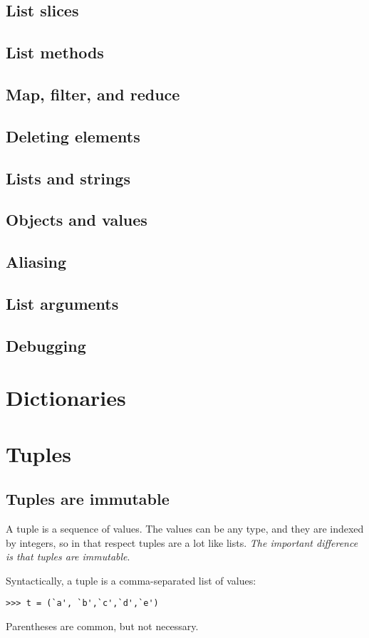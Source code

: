 \documentclass{article}
\begin{document}
\subsection{List slices}
\subsection{List methods}
\subsection{Map, filter, and reduce}
\subsection{Deleting elements}
\subsection{Lists and strings}
\subsection{Objects and values}
\subsection{Aliasing}
\subsection{List arguments}
\subsection{Debugging}

\section{Dictionaries}

\section{Tuples}
\subsection{Tuples are immutable}
A tuple is a sequence of values. The values can be any type, and they are
indexed by integers, so in that respect tuples are a lot like lists.
\emph{The important difference is that tuples are immutable}.

Syntactically, a tuple is a comma-separated list of values:
\begin{verbatim}
>>> t = (`a', `b',`c',`d',`e')
\end{verbatim}
Parentheses are common, but not necessary.
\end{document}
